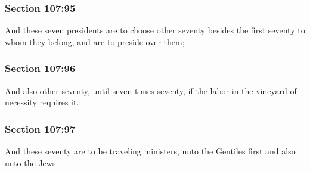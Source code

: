 	\subsubsection{Section 107:95} %
		\label{DC107-95}

		And these seven presidents are to choose other seventy besides the first seventy to whom they belong, and are to preside over them;


	\subsubsection{Section 107:96} %
		\label{DC107-96}

		And also other seventy, until seven times seventy, if the labor in the vineyard of necessity requires it.


	\subsubsection{Section 107:97} %
		\label{DC107-97}

		And these seventy are to be traveling ministers, unto the Gentiles first and also unto the Jews.


